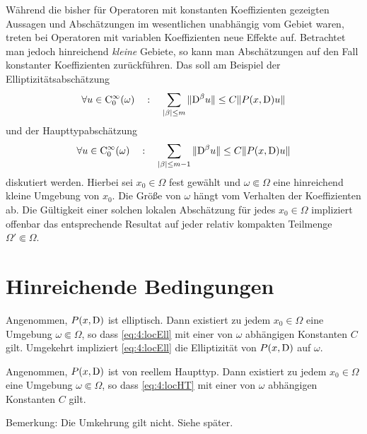 Während die bisher für Operatoren mit konstanten Koeffizienten gezeigten Aussagen und Abschätzungen im wesentlichen unabhängig vom Gebiet waren, 
treten bei Operatoren mit variablen Koeffizienten neue Effekte auf. Betrachtet man jedoch hinreichend {\em kleine} Gebiete, so kann man Abschätzungen auf den Fall konstanter Koeffizienten zurückführen. Das soll am Beispiel der Elliptizitätsabschätzung
\begin{equation}\label{eq:4:locEll}
\forall u\in\mathrm C_0^\infty(\omega)\quad:\quad      \sum_{|\beta|\le m} \| \mathrm D^\beta u\| \le C \| P(x,\mathrm D) u \|
\end{equation}
und der Haupttypabschätzung 
\begin{equation}\label{eq:4:locHT}
\forall u\in\mathrm C_0^\infty(\omega)\quad:\quad      \sum_{|\beta|\le m-1} \| \mathrm D^\beta u\| \le C \| P(x,\mathrm D) u \|
\end{equation}
diskutiert werden. Hierbei sei $x_0\in\Omega$ fest gewählt und $\omega\Subset\Omega$ eine hinreichend kleine Umgebung von $x_0$. Die Größe von $\omega$ hängt vom Verhalten der Koeffizienten ab. Die Gültigkeit einer solchen lokalen Abschätzung für jedes $x_0\in\Omega$ impliziert offenbar das entsprechende Resultat auf jeder relativ kompakten Teilmenge $\Omega'\Subset\Omega$.

\section{Hinreichende Bedingungen}
\cite{Hormander:1955}

\begin{thm}
Angenommen, $P(x,\mathrm D)$ ist elliptisch. Dann existiert zu jedem $x_0\in\Omega$ eine Umgebung $\omega\Subset\Omega$, so dass
\eqref{eq:4:locEll} mit einer von $\omega$ abhängigen Konstanten $C$ gilt. Umgekehrt impliziert \eqref{eq:4:locEll} die Elliptizität von $P(x,\mathrm D)$ auf $\omega$.
\end{thm}


\begin{thm}
Angenommen, $P(x,\mathrm D)$ ist von reellem Haupttyp. Dann existiert zu jedem $x_0\in\Omega$ eine Umgebung $\omega\Subset\Omega$, so dass
\eqref{eq:4:locHT} mit einer von $\omega$ abhängigen Konstanten $C$ gilt.
\end{thm}
Bemerkung: Die Umkehrung gilt nicht. Siehe später.


